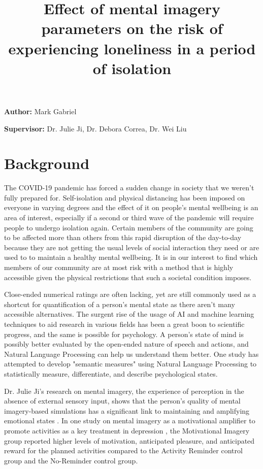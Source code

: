 \documentclass[12pt, a4paper]{article}
\title{Effect of mental imagery parameters on the risk of experiencing loneliness in a period of isolation}
\author{}
\date{}
\newcommand{\namelistlabel}[1]{\mbox{#1}\hfil}
\newenvironment{namelist}[1]{%
\begin{list}{}
    {
        \let\makelabel\namelistlabel
        \settowidth{\labelwidth}{#1}
        \setlength{\leftmargin}{1.1\labelwidth}
    }
  }{%
\end{list}}
\begin{document}
\maketitle

\begin{namelist}{xxxxxxxxxxxx}
\item[{\bf Author:}]
	Mark Gabriel
\item[{\bf Supervisor:}]
	Dr. Julie Ji, Dr. Debora Correa, Dr. Wei Liu
\end{namelist}

\section*{Background} The COVID-19 pandemic has forced a sudden change in society that we weren't fully prepared for.  Self-isolation and physical distancing has been imposed on everyone in varying degrees and the effect of it on people's mental wellbeing is an area of interest, especially if a second or third wave of the pandemic will require people to undergo isolation again. Certain members of the community are going to be affected more than others from this rapid disruption of the day-to-day because they are not getting the usual levels of social interaction they need or are used to to maintain a healthy mental wellbeing. It is in our interest to find which members of our community are at most risk with a method that is highly accessible given the physical restrictions that such a societal condition imposes. 

Close-ended numerical ratings are often lacking, yet are still commonly used as a shortcut for quantification of a person's mental state as there aren't many accessible alternatives. The surgent rise of the usage of AI and machine learning techniques to aid research in various fields has been a great boon to scientific progress, and the same is possible for psychology. A person's state of mind is possibly better evaluated by the open-ended nature of speech and actions, and Natural Language Processing can help us understand them better. One study \cite{semanticmeasures} has attempted to develop "semantic measures" using Natural Language Processing to statistically measure, differentiate, and describe psychological states.

Dr. Julie Ji's research on mental imagery, the experience of perception in the absence of external sensory input, shows that the person's quality of mental imagery-based simulations has a significant link to maintaining and amplifying emotional states \cite{conceptualandclinical}. In one study on mental imagery as a motivational amplifier to promote activities as a key treatment in depression \cite{motivationalamplifier}, the Motivational Imagery group reported higher levels of motivation, anticipated pleasure, and anticipated reward for the planned activities compared to the Activity Reminder control group and the No-Reminder control group.
\end{document}

